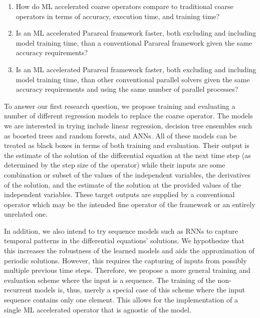 \documentclass{article}
\begin{document}
\begin{enumerate}
    \item How do ML accelerated coarse operators compare to traditional coarse operators in terms of accuracy, execution time, and training time?
    \item Is an ML accelerated Parareal framework faster, both excluding and including model training time, than a conventional Parareal framework given the same accuracy requirements?
    \item Is an ML accelerated Parareal framework faster, both excluding and including model training time, than other conventional parallel solvers given the same accuracy requirements and using the same number of parallel processes?
\end{enumerate}

To answer our first research question, we propose training and evaluating a number of different regression models to replace the coarse operator. The models we are interested in trying include linear regression, decision tree ensembles such as boosted trees and random forests, and ANNs. All of these models can be treated as black boxes in terms of both training and evaluation. Their output is the estimate of the solution of the differential equation at the next time step (as determined by the step size of the operator) while their inputs are some combination or subset of the values of the independent variables, the derivatives of the solution, and the estimate of the solution at the provided values of the independent variables. These target outputs are supplied by a conventional operator which may be the intended fine operator of the framework or an entirely unrelated one.

In addition, we also intend to try sequence models such as RNNs to capture temporal patterns in the differential equations' solutions. We hypothesize that this increases the robustness of the learned models and aids the approximation of periodic solutions. However, this requires the capturing of inputs from possibly multiple previous time steps. Therefore, we propose a more general training and evaluation scheme where the input is a sequence. The training of the non-recurrent models is, thus, merely a special case of this scheme where the input sequence contains only one element. This allows for the implementation of a single ML accelerated operator that is agnostic of the model.
\end{document}
